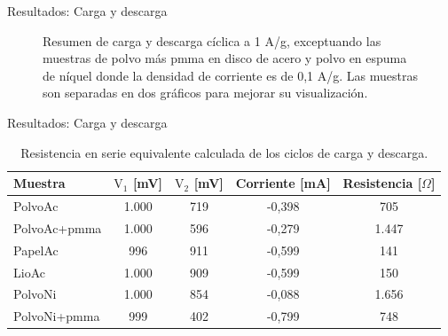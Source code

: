 \documentclass[aspectratio=169]{beamer}
\newcommand{\plotscale}{0.8}
\newcommand{\mPolvoAcero}{PolvoAc }
\newcommand{\mPolvoAceroPMMA}{PolvoAc+pmma }
\newcommand{\mPapelAcero}{PapelAc }
\newcommand{\mLiofilizadoAcero}{LioAc }
\newcommand{\mPolvoNiquel}{PolvoNi }
\newcommand{\mPolvoNiquelPMMA}{PolvoNi+pmma }
\begin{document}
\begin{frame}{Resultados: Carga y descarga}
\begin{figure}[h!]
\begin{subfigure}[b]{0.4\textwidth}
			\end{subfigure}
			\caption[Resumen de carga y descarga cíclica]{Resumen de carga y descarga cíclica a 1 A/g, exceptuando las muestras de polvo más pmma en disco de acero y polvo en espuma de níquel donde la densidad de corriente es de 0,1 A/g. Las muestras son separadas en dos gráficos para mejorar su visualización.}
			\label{fig:resumen_ccd}
		\end{figure}
	\end{frame}

	\begin{frame}{Resultados: Carga y descarga}
		\begin{table}[h!]
			\centering
			\caption{Resistencia en serie equivalente calculada de los ciclos de carga y descarga.}
			\begin{tabular}{l c c c c}
				Muestra	&	$\mathrm{V_1}$ [mV]	&	$\mathrm{V_2}$ [mV]	&	Corriente [mA]	&	Resistencia [$\Omega$]	\\
				\hline
				\mPolvoAcero			&	1.000	&	719	&	-0,398	&	705		\\
				\mPolvoAceroPMMA		&	1.000	&	596	&	-0,279	&	1.447	\\
				\rowcolor{samplegreen}
				\mPapelAcero			&	996		&	911	&	-0,599	&	141		\\
				\rowcolor{samplegreen}
				\mLiofilizadoAcero		&	1.000	&	909	&	-0,599	&	150		\\
				\mPolvoNiquel			&	1.000	&	854	&	-0,088	&	1.656	\\
				\mPolvoNiquelPMMA		&	999		&	402	&	-0,799	&	748		\\
			\end{tabular}
			\label{tab:esr}
		\end{table}
	\end{frame}
\end{document}
